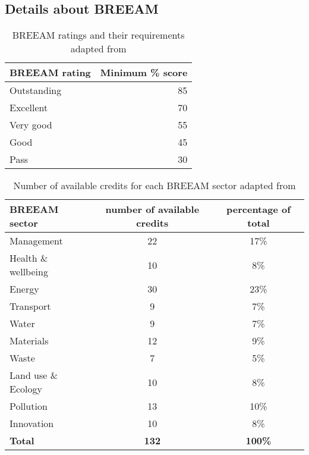 \documentclass[a4paper,fleqn]{article}
\renewcommand{\cite}{\citep}
\begin{document}
\subsection{Details about BREEAM}
\begin{table}[H]
	\begin{center}
		\begin{tabular}{| l | r |}
			\hline
			\textbf{BREEAM rating} & \textbf{Minimum \% score}\\
			\hline
			Outstanding & 85\\
			Excellent & 70\\
			Very good & 55\\
			Good & 45\\
			Pass & 30\\
			\hline
		\end{tabular}
	\end{center}
	\caption{BREEAM ratings and their requirements adapted from \cite{BRE2012}}
	\label{tab:BREEAMMarks}
\end{table}

\begin{table}[H]
	\begin{center}
		\begin{tabular}{| l | c | c |}
			\hline
			\textbf{BREEAM sector} & \textbf{number of available credits} & \textbf{percentage of total}\\
			\hline
			Management & 22 & 17\% \\
			Health \& wellbeing & 10 & 8\% \\
			Energy & 30 & 23\% \\
			Transport & 9 & 7\% \\
			Water & 9 & 7\% \\
			Materials & 12 & 9\% \\
			Waste & 7 & 5\% \\
			Land use \& Ecology & 10 & 8\% \\
			Pollution & 13 & 10\% \\
			Innovation & 10 & 8\% \\
			\hline
			\textbf{Total} & \textbf{132} & \textbf{100\%} \\
			\hline
		\end{tabular}
	\end{center}
	\caption{Number of available credits for each BREEAM sector adapted from \cite{BRE2012}}
	\label{tab:BREEAMSectors}
\end{table}
\end{document}
